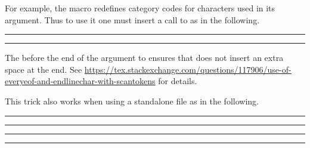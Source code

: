 \documentclass[10pt]{ltxdoc}
\newcommand{\showfile}[1]{
  \begin{tcolorbox}[title=\texttt{#1}]
  
  \end{tcolorbox}
}
\def\gauge{%
  \rule{0.2em}{7pt}%
  \llap{\rule[8pt]{0.2em}{2pt}}%
}
\begin{document}
For example, the  macro redefines category codes
for characters used in its argument.
Thus to use it one must insert a call to  as in the
following.

\begin{tcblisting}{}
\gauge
{}%
\gauge
\end{tcblisting}

The  before the end of the argument to 
ensures that  does not insert an extra space at the end.
See
\url{https://tex.stackexchange.com/questions/117906/use-of-everyeof-and-endlinechar-with-scantokens}
for details.

This trick also works when using a standalone file as in the following.

\showfile{example-standalone-catcode.tex}

\begin{tcblisting}{}
\gauge\ExternalCompile[file=example-standalone-catcode]\gauge

\gauge\ExternalRead[file=example-standalone-catcode]\gauge
\end{tcblisting}
\end{document}
